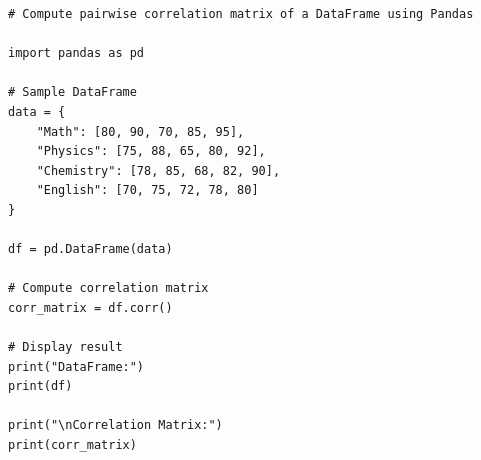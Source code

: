 \begin{verbatim}
# Compute pairwise correlation matrix of a DataFrame using Pandas

import pandas as pd

# Sample DataFrame
data = {
    "Math": [80, 90, 70, 85, 95],
    "Physics": [75, 88, 65, 80, 92],
    "Chemistry": [78, 85, 68, 82, 90],
    "English": [70, 75, 72, 78, 80]
}

df = pd.DataFrame(data)

# Compute correlation matrix
corr_matrix = df.corr()

# Display result
print("DataFrame:")
print(df)

print("\nCorrelation Matrix:")
print(corr_matrix)
\end{verbatim}